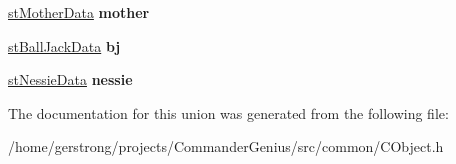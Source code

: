 \begin{DoxyCompactItemize}
\item 
\hypertarget{union_c_object_1_1ai_ad292f2f513d3ae52f9c49ab94c876565}{
\hyperlink{structst_mother_data}{stMotherData} {\bfseries mother}}
\label{union_c_object_1_1ai_ad292f2f513d3ae52f9c49ab94c876565}

\item 
\hypertarget{union_c_object_1_1ai_a7b9dda8d587384651db5776170e75a49}{
\hyperlink{structst_ball_jack_data}{stBallJackData} {\bfseries bj}}
\label{union_c_object_1_1ai_a7b9dda8d587384651db5776170e75a49}

\item 
\hypertarget{union_c_object_1_1ai_ac6ca110279602e55d70a57d961cd284d}{
\hyperlink{structst_nessie_data}{stNessieData} {\bfseries nessie}}
\label{union_c_object_1_1ai_ac6ca110279602e55d70a57d961cd284d}

\end{DoxyCompactItemize}


The documentation for this union was generated from the following file:\begin{DoxyCompactItemize}
\item 
/home/gerstrong/projects/CommanderGenius/src/common/CObject.h\end{DoxyCompactItemize}
